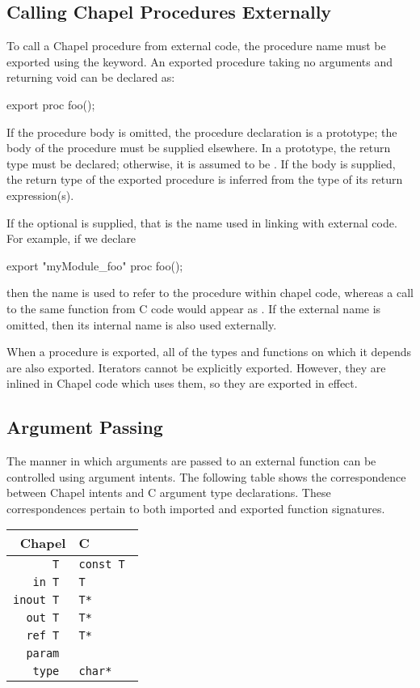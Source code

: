\subsection{Calling Chapel Procedures Externally}
\label{Calling_Chapel_Procedures_Externally}

To call a Chapel procedure from external code, the procedure name must be
exported using the  keyword.  An exported procedure taking no
arguments and returning void can be declared as:
\begin{chapel}
export proc foo();
\end{chapel}
If the procedure body is omitted, the procedure declaration is a prototype; the
body of the procedure must be supplied elsewhere.  In a prototype, the return
type must be declared; otherwise, it is assumed to be .  If the body
is supplied, the return type of the exported procedure is inferred from the
type of its return expression(s).

If the optional  is supplied, that is the name used in
linking with external code.  For example, if we declare
\begin{chapel}
export "myModule_foo" proc foo();
\end{chapel}
\noindent
then the name  is used to refer to the procedure within chapel code,
whereas a call to the same function from C code would appear
as .  If the external name is omitted, then its internal
name is also used externally.

When a procedure is exported, all of the types and functions on which it depends
are also exported.  Iterators cannot be explicitly exported.  However, they are
inlined in Chapel code which uses them, so they are exported in effect.

\subsection{Argument Passing}
\label{Interop_Argument_Passing}

The manner in which arguments are passed to an external function can be
controlled using argument intents.  The following table shows the correspondence
between Chapel intents and C argument type declarations.  These correspondences
pertain to both imported and exported function signatures.

\begin{tabular}{rl}
Chapel & C \\
\hline
\tt T & \tt const T \\
\tt in T & \tt T \\
\tt inout T & \tt T* \\
\tt out T & \tt T* \\
\tt ref T & \tt T* \\
\tt param & \tt \\
\tt type & \tt char*\\
\end{tabular}

